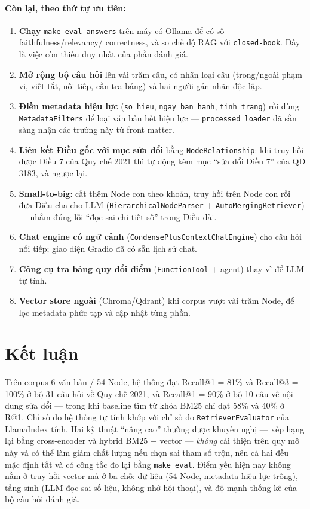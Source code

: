 \paragraph{Còn lại, theo thứ tự ưu tiên:}
\begin{enumerate}
  \item \textbf{Chạy} \texttt{make eval-answers} trên máy có Ollama để có số faithfulness/relevancy/
        correctness, và so chế độ RAG với \texttt{closed-book}. Đây là việc còn thiếu duy nhất của
        phần đánh giá.
  \item \textbf{Mở rộng bộ câu hỏi} lên vài trăm câu, có nhãn loại câu (trong/ngoài phạm vi, viết tắt,
        nối tiếp, cần tra bảng) và hai người gán nhãn độc lập.
  \item \textbf{Điền metadata hiệu lực} (\texttt{so\_hieu}, \texttt{ngay\_ban\_hanh}, \texttt{tinh\_trang})
        rồi dùng \texttt{MetadataFilters} để loại văn bản hết hiệu lực --- \texttt{processed\_loader}
        đã sẵn sàng nhận các trường này từ front matter.
  \item \textbf{Liên kết Điều gốc với mục sửa đổi} bằng \texttt{NodeRelationship}: khi truy hồi được
        Điều 7 của Quy chế 2021 thì tự động kèm mục ``sửa đổi Điều 7'' của QĐ 3183, và ngược lại.
  \item \textbf{Small-to-big}: cắt thêm Node con theo khoản, truy hồi trên Node con rồi đưa Điều cha
        cho LLM (\texttt{HierarchicalNodeParser} + \texttt{AutoMergingRetriever}) --- nhắm đúng lỗi
        ``đọc sai chi tiết số'' trong Điều dài.
  \item \textbf{Chat engine có ngữ cảnh} (\texttt{CondensePlusContextChatEngine}) cho câu hỏi nối tiếp;
        giao diện Gradio đã có sẵn lịch sử chat.
  \item \textbf{Công cụ tra bảng quy đổi điểm} (\texttt{FunctionTool} + agent) thay vì để LLM tự tính.
  \item \textbf{Vector store ngoài} (Chroma/Qdrant) khi corpus vượt vài trăm Node, để lọc metadata
        phức tạp và cập nhật từng phần.
\end{enumerate}


\section{Kết luận}

Trên corpus 6 văn bản / 54 Node, hệ thống đạt Recall@1 = 81\% và Recall@3 = 100\% ở bộ 31 câu hỏi về
Quy chế 2021, và Recall@1 = 90\% ở bộ 10 câu về nội dung sửa đổi --- trong khi baseline tìm từ khóa
BM25 chỉ đạt 58\% và 40\% ở R@1. Chỉ số do hệ thống tự tính khớp với chỉ số do
\texttt{RetrieverEvaluator} của LlamaIndex tính. Hai kỹ thuật ``nâng cao'' thường được khuyến nghị
--- xếp hạng lại bằng cross-encoder và hybrid BM25 + vector --- \emph{không} cải thiện trên quy mô
này và có thể làm giảm chất lượng nếu chọn sai tham số trộn, nên cả hai đều mặc định tắt và có công
tắc đo lại bằng \texttt{make eval}. Điểm yếu hiện nay không nằm ở truy hồi vector mà ở ba chỗ: dữ
liệu (54 Node, metadata hiệu lực trống), tầng sinh (LLM đọc sai số liệu, không nhớ hội thoại), và
độ mạnh thống kê của bộ câu hỏi đánh giá.

